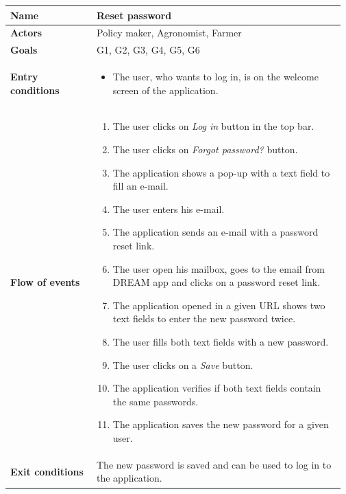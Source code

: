 \begin{table}[H]
    \centering
	\begin{tabular}{@{}p{0.25\linewidth} p{0.72\linewidth}@{}}
\toprule
		\textbf{Name}               & Reset password\\
		\midrule
		\textbf{Actors}             & Policy maker, Agronomist, Farmer\\
		\midrule
		\textbf{Goals}              & G1, G2, G3, G4, G5, G6 \\
		\midrule
		
		\textbf{Entry conditions}   & \begin{itemize}[leftmargin=.4cm,noitemsep,topsep=0pt,before=\vspace{-3mm},after=\vspace{-4mm}]
		    \item The user, who wants to log in, is on the welcome screen of the application.
		\end{itemize}\\
		\midrule
		
		\textbf{Flow of events}     & \begin{enumerate}[leftmargin=.4cm,noitemsep,topsep=0pt,before=\vspace{-3mm},after=\vspace{-4mm}]
		    \item The user clicks on \textit{Log in} button in the top bar.
		    \item The user clicks on \textit{Forgot password?} button.
		    \item The application shows a pop-up with a text field to fill an e-mail.
		    \item The user enters his e-mail.
		    \item The application sends an e-mail with a password reset link.
		    \item The user open his mailbox, goes to the email from DREAM app and clicks on a password reset link.
		    \item The application opened in a given URL shows two text fields to enter the new password twice.
		    \item The user fills both text fields with a new password.
		    \item The user clicks on a \textit{Save} button.
		    \item The application verifies if both text fields contain the same passwords.
		    \item The application saves the new password for a given user.
		\end{enumerate}\\
		\midrule
		\textbf{Exit conditions}    & The new password is saved and can be used to log in to the application.
		\\ \midrule
		

\end{tabular}
\end{table}
